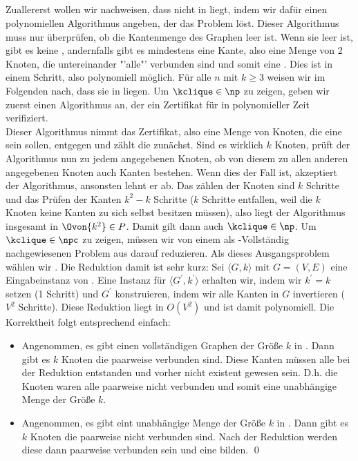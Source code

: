 \documentclass[a4paper]{article}
\begin{document}
		\subsection{}
			Zuallererst wollen wir nachweisen, dass \twoclique nicht in \npc liegt, indem wir dafür einen polynomiellen Algorithmus angeben, der das Problem löst. Dieser Algorithmus muss nur überprüfen, ob die Kantenmenge des Graphen leer ist. Wenn sie leer ist, gibt es keine \twoclique, andernfalls gibt es mindestens eine Kante, also eine Menge von 2 Knoten, die untereinander "'alle"' verbunden sind und somit eine \twoclique. Dies ist in einem Schritt, also polynomiell möglich.\n
			Für alle \kclique $n$ mit $ k \geq 3 $ weisen wir im Folgenden nach, dass sie in \npc liegen.\n
			Um $\kclique \in \np$ zu zeigen, geben wir zuerst einen Algorithmus an, der ein Zertifikat für \kclique in polynomieller Zeit verifiziert. \\
			Dieser Algorithmus nimmt das Zertifikat, also eine Menge von Knoten, die eine \kclique sein sollen, entgegen und zählt die zunächst. Sind es wirklich $k$ Knoten, prüft der Algorithmus nun zu jedem angegebenen Knoten, ob von diesem zu allen anderen angegebenen Knoten auch Kanten bestehen. Wenn dies der Fall ist, akzeptiert der Algorithmus, ansonsten lehnt er ab. Das zählen der Knoten sind $k$ Schritte und das Prüfen der Kanten $k^2 - k$ Schritte ($k$ Schritte entfallen, weil die $k$ Knoten keine Kanten zu sich selbst besitzen müssen), also liegt der Algorithmus insgesamt in $\Ovon{k^2} \in P$. Damit gilt dann auch $\kclique \in \np$.\n
			Um $\kclique \in \npc$ zu zeigen, müssen wir von einem als \np-Vollständig nachgewiesenen Problem aus darauf reduzieren. Als dieses Ausgangsproblem wählen wir \indepset.\n
			Die Reduktion damit ist sehr kurz: Sei $ \langle G, k \rangle $ mit $ G = (V, E)$ eine Eingabeinstanz von \indepset. Eine Instanz für $ \langle G^\prime, k^\prime \rangle $ \kclique erhalten wir, indem wir $k^\prime = k$ setzen (1 Schritt) und $G^\prime$ konstruieren, indem wir alle Kanten in $G$ invertieren ($V^2$ Schritte). Diese Reduktion liegt in $O(V^2)$ und ist damit polynomiell.\n
			Die Korrektheit folgt entsprechend einfach:
			\begin{itemize}
			\item Angenommen, es gibt einen vollständigen Graphen der Größe $k$ in \kclique. Dann gibt es $k$ Knoten die paarweise verbunden sind. Diese Kanten müssen alle bei der Reduktion entstanden und vorher nicht existent gewesen sein. D.h. die Knoten waren alle paarweise nicht verbunden und somit eine unabhängige Menge der Größe $k$.
			\item Angenommen, es gibt eint unabhängige Menge der Größe $k$ in \indepset. Dann gibt es $k$ Knoten die paarweise nicht verbunden sind. Nach der Reduktion werden diese dann paarweise verbunden sein und eine \kclique bilden. \qed
			\end{itemize}
\end{document}
